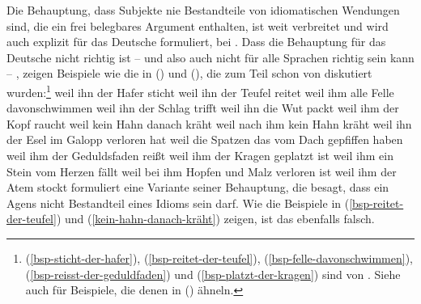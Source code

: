 Die Behauptung, dass Subjekte nie Bestandteile von idiomatischen Wendungen sind, die ein frei belegbares
Argument enthalten, ist weit verbreitet \parencites[siehe z.\,B.][]{denDikken95a}[--116]{Kratzer96a} und wird auch explizit für das Deutsche formuliert, \zb bei \citet[]{Grewendorf2002a}.
Dass die Behauptung für das Deutsche nicht richtig ist -- und also auch nicht für alle Sprachen richtig sein kann -- ,
zeigen Beispiele wie die in () und (), die zum Teil schon von \citet[]{Reis82} diskutiert
wurden:\footnote{
(\ref{bsp-sticht-der-hafer}), (\ref{bsp-reitet-der-teufel}), (\ref{bsp-felle-davonschwimmen}),
(\ref{bsp-reisst-der-geduldfaden}) und (\ref{bsp-platzt-der-kragen})
 sind von \citet[]{Reis82}. Siehe auch \citet[]{Haider93a} für Beispiele,
die denen in () ähneln.%
}
\eal
\ex\label{bsp-sticht-der-hafer}
weil ihn der Hafer sticht          %
\ex\label{bsp-reitet-der-teufel}
weil ihn der Teufel reitet         %
\ex\label{bsp-felle-davonschwimmen}
weil ihm alle Felle davonschwimmen %
\ex weil ihn der Schlag trifft     %
\ex\label{ex-ihn-die-wut-packt}
weil ihn die Wut packt         %
\ex weil ihm der Kopf raucht       %
\ex\label{kein-hahn-danach-kräht}
weil kein Hahn danach kräht    %
\ex 
weil nach ihm kein Hahn kräht                  %
\ex 
weil ihn der Esel im Galopp verloren hat   %
\ex\label{spatzen-gepfiffen}
weil die Spatzen das vom Dach gepfiffen haben  %
\zl
\eal
\ex\label{bsp-reisst-der-geduldfaden}
weil ihm der Geduldsfaden reißt
\ex\label{bsp-platzt-der-kragen}
weil ihm der Kragen geplatzt ist
\ex weil ihm ein Stein vom Herzen fällt
\ex weil bei ihm Hopfen und Malz verloren ist%
%
\ex weil ihm der Atem stockt
\zl
\citet[--209]{Marantz97a} formuliert eine Variante seiner Behauptung, die besagt, dass ein Agens 
nicht Bestandteil eines Idioms sein
darf. Wie die Beispiele in (\ref{bsp-reitet-der-teufel}) und (\ref{kein-hahn-danach-kräht})
zeigen, ist das ebenfalls falsch.

